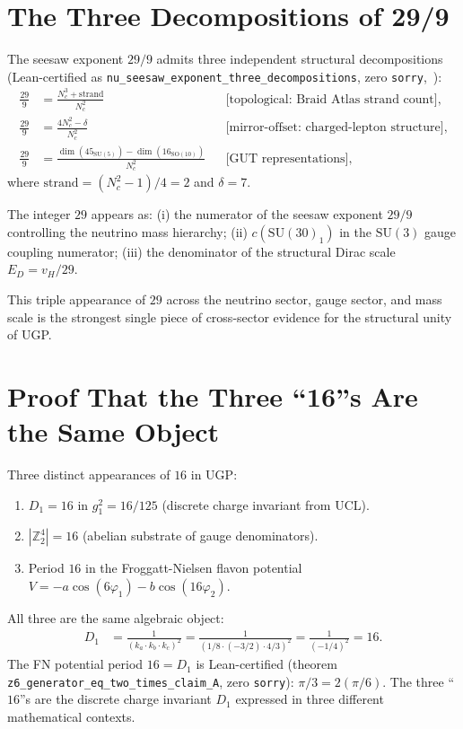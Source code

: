 \documentclass[11pt]{article}
\theoremstyle{remark}
\newcommand{\Nc}{N_c}
\newcommand{\ddelta}{\delta}
\begin{document}
\section{The Three Decompositions of 29/9}
\label{app:29}

The seesaw exponent $29/9$ admits three independent structural decompositions
(Lean-certified as \texttt{nu\_seesaw\_exponent\_three\_decompositions},
zero \texttt{sorry},~\cite{SpivackUGPFormalization}):
\begin{align*}
  \frac{29}{9} &= \frac{\Nc^3 + \mathrm{strand}}{\Nc^2}
               && \text{[topological: Braid Atlas strand count]}, \\[3pt]
  \frac{29}{9} &= \frac{4\Nc^2 - \ddelta}{\Nc^2}
               && \text{[mirror-offset: charged-lepton structure]}, \\[3pt]
  \frac{29}{9} &= \frac{\dim(45_{\mathrm{SU}(5)}) - \dim(16_{\mathrm{SO}(10)})}{\Nc^2}
               && \text{[GUT representations]},
\end{align*}
where $\mathrm{strand} = (\Nc^2-1)/4 = 2$ and $\ddelta = 7$.

The integer $29$ appears as:
(i) the numerator of the seesaw exponent $29/9$ controlling the neutrino mass hierarchy;
(ii) $c(\mathrm{SU}(30)_1)$ in the $\mathrm{SU}(3)$ gauge coupling numerator;
(iii) the denominator of the structural Dirac scale $E_D = v_H/29$.

This triple appearance of $29$ across the neutrino sector, gauge sector, and mass scale
is the strongest single piece of cross-sector evidence for the structural unity of UGP.

\section{Proof That the Three ``16''s Are the Same Object}
\label{app:16}

Three distinct appearances of $16$ in UGP:
\begin{enumerate}[leftmargin=2em]
  \item $D_1 = 16$ in $g_1^2 = 16/125$ (discrete charge invariant from UCL).
  \item $|\mathbb{Z}_2^4| = 16$ (abelian substrate of gauge denominators).
  \item Period $16$ in the Froggatt-Nielsen flavon potential
        $V = -a\cos(6\varphi_1) - b\cos(16\varphi_2)$.
\end{enumerate}

All three are the same algebraic object:
\begin{align*}
  D_1 &= \frac{1}{(k_a \cdot k_b \cdot k_c)^2}
       = \frac{1}{(1/8 \cdot (-3/2) \cdot 4/3)^2}
       = \frac{1}{(-1/4)^2} = 16.
\end{align*}
The FN potential period $16 = D_1$ is Lean-certified
(theorem \texttt{z6\_gen\-er\-a\-tor\-\_eq\-\_two\-\_times\-\_claim\_A},
zero \texttt{sorry}): $\pi/3 = 2(\pi/6)$.
The three ``$16$''s are the discrete charge invariant $D_1$ expressed in three
different mathematical contexts.
\end{document}

